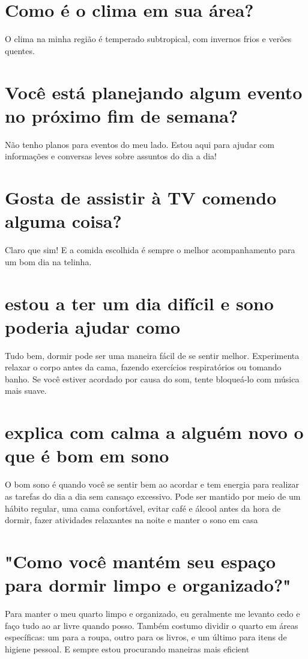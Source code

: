 \documentclass[11pt,a4paper]{article}
\begin{document}
\section{Como é o clima em sua área?}
O clima na minha região é temperado subtropical, com invernos frios e verões quentes.

\section{Você está planejando algum evento no próximo fim de semana?}
Não tenho planos para eventos do meu lado. Estou aqui para ajudar com informações e conversas leves sobre assuntos do dia a dia!

\section{Gosta de assistir à TV comendo alguma coisa?}
Claro que sim! E a comida escolhida é sempre o melhor acompanhamento para um bom dia na telinha.

\section{estou a ter um dia difícil e sono poderia ajudar como}
Tudo bem, dormir pode ser uma maneira fácil de se sentir melhor. Experimenta relaxar o corpo antes da cama, fazendo exercícios respiratórios ou tomando banho. Se você estiver acordado por causa do som, tente bloqueá-lo com música mais suave.

\section{explica com calma a alguém novo o que é bom em sono}
O bom sono é quando você se sentir bem ao acordar e tem energia para realizar as tarefas do dia a dia sem cansaço excessivo. Pode ser mantido por meio de um hábito regular, uma cama confortável, evitar café e álcool antes da hora de dormir, fazer atividades relaxantes na noite e manter o sono em casa

\section{"Como você mantém seu espaço para dormir limpo e organizado?"}
Para manter o meu quarto limpo e organizado, eu geralmente me levanto cedo e faço tudo ao ar livre quando posso. Também costumo dividir o quarto em áreas específicas: um para a roupa, outro para os livros, e um último para itens de higiene pessoal. E sempre estou procurando maneiras mais eficient
\end{document}
